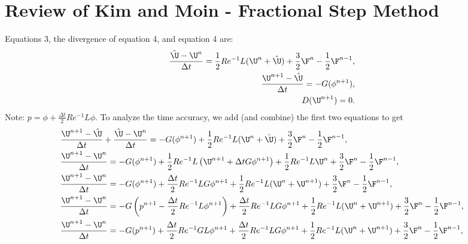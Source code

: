 \documentclass[11pt]{article}
\newcommand{\ReInv}{Re^{-1}}
\begin{document}
\section{Review of Kim and Moin - Fractional Step Method}
Equations 3, the divergence of equation 4, and equation 4 are:
\begin{equation}\begin{aligned} \label{eq:TD_FSM_KM}
\frac{\hat{\U}-\U^n}{\Delta t} = \frac{1}{2} \ReInv L(\U^n+\hat{\U}) + \frac{3}{2}\F^n - \frac{1}{2}\F^{n-1}, \\
\frac{\U^{n+1}-\hat{\U}}{\Delta t} =  - G (\phi^{n+1}), \\
D(\U^{n+1}) = 0.
\end{aligned} \end{equation}
Note: $p = \phi + \frac{\Delta t}{2} \ReInv L \phi$. To analyze the time accuracy, we add (and combine) the first two equations to get
\begin{equation}\begin{aligned}
& \frac{\U^{n+1}-\hat{\U}}{\Delta t} + \frac{\hat{\U}-\U^n}{\Delta t} = - G (\phi^{n+1}) + \frac{1}{2} \ReInv L(\U^n+\hat{\U}) + \frac{3}{2}\F^n - \frac{1}{2}\F^{n-1}, \\
& \frac{\U^{n+1}-\U^n}{\Delta t} = - G (\phi^{n+1}) + \frac{1}{2} \ReInv L\left(\U^{n+1}+ \Delta t G\phi^{n+1} \right) + \frac{1}{2} \ReInv L\U^n + \frac{3}{2}\F^n - \frac{1}{2}\F^{n-1}, \\
& \frac{\U^{n+1}-\U^n}{\Delta t} = - G (\phi^{n+1}) + \frac{\Delta t}{2} \ReInv L G\phi^{n+1} + \frac{1}{2} \ReInv L(\U^n+\U^{n+1}) + \frac{3}{2}\F^n - \frac{1}{2}\F^{n-1}, \\
& \frac{\U^{n+1}-\U^n}{\Delta t} = - G \left(p^{n+1} - \frac{\Delta t}{2} \ReInv L \phi^{n+1}\right) + \frac{\Delta t}{2} \ReInv L G\phi^{n+1} + \frac{1}{2} \ReInv L(\U^n+\U^{n+1}) + \frac{3}{2}\F^n - \frac{1}{2}\F^{n-1}, \\
& \frac{\U^{n+1}-\U^n}{\Delta t} = - G (p^{n+1}) + \frac{\Delta t}{2} \ReInv G L \phi^{n+1} + \frac{\Delta t}{2} \ReInv L G\phi^{n+1} + \frac{1}{2} \ReInv L(\U^n+\U^{n+1}) + \frac{3}{2}\F^n - \frac{1}{2}\F^{n-1}, \\
\end{aligned} \end{equation}
\end{document}
